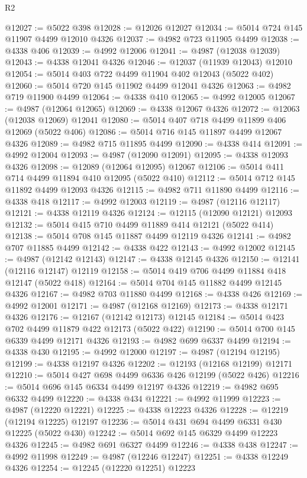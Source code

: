 \begin{lexlean}{R2}
\begin{coremodule}
@12027 := @5022 @398
@12028 := @12026 @12027
@12034 := @5014 @724 @145 @11907 @4499 @12010 @4326
@12037 := @4982 @723 @11905 @4499
@12038 := @4338 @406
@12039 := @4992 @12006
@12041 := @4987 (@12038 @12039)
@12043 := @4338 @12041 @4326
@12046 := @12037 (@11939 @12043) @12010
@12054 := @5014 @403 @722 @4499 @11904 @402 @12043 (@5022 @402)
@12060 := @5014 @720 @145 @11902 @4499 @12041 @4326
@12063 := @4982 @719 @11900 @4499
@12064 := @4338 @410
@12065 := @4992 @12005
@12067 := @4987 (@12064 @12065)
@12069 := @4338 @12067 @4326
@12072 := @12063 (@12038 @12069) @12041
@12080 := @5014 @407 @718 @4499 @11899 @406 @12069 (@5022 @406)
@12086 := @5014 @716 @145 @11897 @4499 @12067 @4326
@12089 := @4982 @715 @11895 @4499
@12090 := @4338 @414
@12091 := @4992 @12004
@12093 := @4987 (@12090 @12091)
@12095 := @4338 @12093 @4326
@12098 := @12089 (@12064 @12095) @12067
@12106 := @5014 @411 @714 @4499 @11894 @410 @12095 (@5022 @410)
@12112 := @5014 @712 @145 @11892 @4499 @12093 @4326
@12115 := @4982 @711 @11890 @4499
@12116 := @4338 @418
@12117 := @4992 @12003
@12119 := @4987 (@12116 @12117)
@12121 := @4338 @12119 @4326
@12124 := @12115 (@12090 @12121) @12093
@12132 := @5014 @415 @710 @4499 @11889 @414 @12121 (@5022 @414)
@12138 := @5014 @708 @145 @11887 @4499 @12119 @4326
@12141 := @4982 @707 @11885 @4499
@12142 := @4338 @422
@12143 := @4992 @12002
@12145 := @4987 (@12142 @12143)
@12147 := @4338 @12145 @4326
@12150 := @12141 (@12116 @12147) @12119
@12158 := @5014 @419 @706 @4499 @11884 @418 @12147 (@5022 @418)
@12164 := @5014 @704 @145 @11882 @4499 @12145 @4326
@12167 := @4982 @703 @11880 @4499
@12168 := @4338 @426
@12169 := @4992 @12001
@12171 := @4987 (@12168 @12169)
@12173 := @4338 @12171 @4326
@12176 := @12167 (@12142 @12173) @12145
@12184 := @5014 @423 @702 @4499 @11879 @422 @12173 (@5022 @422)
@12190 := @5014 @700 @145 @6339 @4499 @12171 @4326
@12193 := @4982 @699 @6337 @4499
@12194 := @4338 @430
@12195 := @4992 @12000
@12197 := @4987 (@12194 @12195)
@12199 := @4338 @12197 @4326
@12202 := @12193 (@12168 @12199) @12171
@12210 := @5014 @427 @698 @4499 @6336 @426 @12199 (@5022 @426)
@12216 := @5014 @696 @145 @6334 @4499 @12197 @4326
@12219 := @4982 @695 @6332 @4499
@12220 := @4338 @434
@12221 := @4992 @11999
@12223 := @4987 (@12220 @12221)
@12225 := @4338 @12223 @4326
@12228 := @12219 (@12194 @12225) @12197
@12236 := @5014 @431 @694 @4499 @6331 @430 @12225 (@5022 @430)
@12242 := @5014 @692 @145 @6329 @4499 @12223 @4326
@12245 := @4982 @691 @6327 @4499
@12246 := @4338 @438
@12247 := @4992 @11998
@12249 := @4987 (@12246 @12247)
@12251 := @4338 @12249 @4326
@12254 := @12245 (@12220 @12251) @12223

\end{coremodule}
\end{lexlean}
